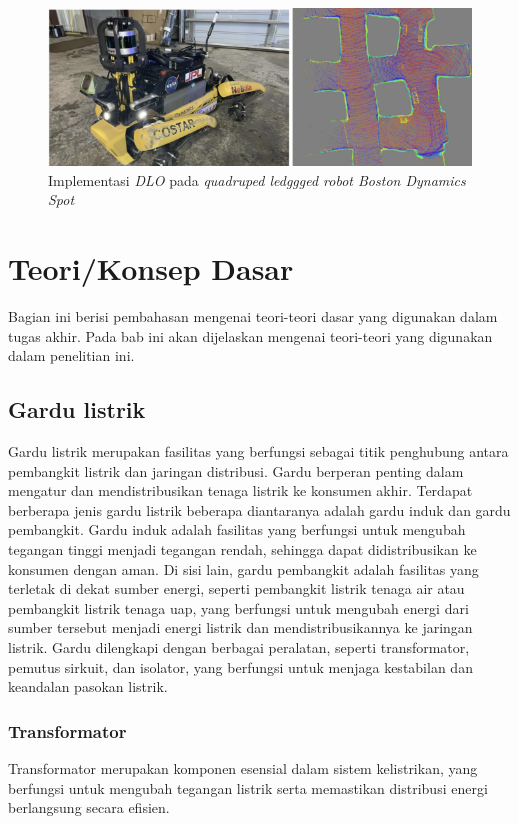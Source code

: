 \begin{figure} [H] \centering
  \includegraphics{gambar/dlo.png}
  \caption{Implementasi \emph{DLO} pada \emph{quadruped ledggged robot Boston Dynamics Spot}}
  \label{fig:Implementasi DLO pada quadruped legged robot Boston Dynamics Spot}
\end{figure}

\section{Teori/Konsep Dasar}
Bagian ini berisi pembahasan mengenai teori-teori dasar yang digunakan dalam tugas akhir. Pada bab ini akan dijelaskan mengenai teori-teori yang digunakan dalam penelitian ini. 

\subsection{Gardu listrik}
Gardu listrik merupakan fasilitas yang berfungsi sebagai titik penghubung antara pembangkit listrik dan jaringan distribusi. Gardu berperan penting dalam mengatur dan mendistribusikan tenaga listrik ke konsumen akhir. Terdapat berberapa jenis gardu listrik beberapa diantaranya adalah gardu induk dan gardu pembangkit. Gardu induk adalah fasilitas yang berfungsi untuk mengubah tegangan tinggi menjadi tegangan rendah, sehingga dapat didistribusikan ke konsumen dengan aman. Di sisi lain, gardu pembangkit adalah fasilitas yang terletak di dekat sumber energi, seperti pembangkit listrik tenaga air atau pembangkit listrik tenaga uap, yang berfungsi untuk mengubah energi dari sumber tersebut menjadi energi listrik dan mendistribusikannya ke jaringan listrik. Gardu dilengkapi dengan berbagai peralatan, seperti transformator, pemutus sirkuit, dan isolator, yang berfungsi untuk menjaga kestabilan dan keandalan pasokan listrik. 

\subsubsection{Transformator}
Transformator merupakan komponen esensial dalam sistem kelistrikan, yang berfungsi untuk mengubah tegangan listrik serta memastikan distribusi energi berlangsung secara efisien.

